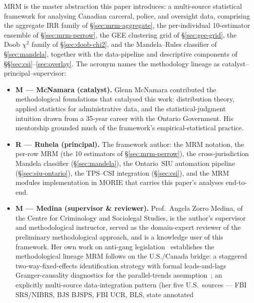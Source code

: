 \documentclass[11pt,a4paper]{article}
\theoremstyle{plain}
\theoremstyle{definition}
\theoremstyle{remark}
\begin{document}
MRM is the master abstraction this paper introduces: a multi-source
statistical framework for analysing Canadian carceral, police, and
oversight data, comprising the aggregate IRR family of
\S\ref{sec:mrm-aggregate}, the per-individual 10-estimator
ensemble of \S\ref{sec:mrm-perrow}, the GEE clustering grid of
\S\ref{sec:gee-grid}, the Doob $\chi^{2}$ family of
\S\ref{sec:doob-chi2}, and the Mandela--Rules classifier of
\S\ref{sec:mandela}, together with the data-pipeline and
descriptive components of
\S\S\ref{sec:csi}--\ref{sec:overlay}. The acronym names the
methodology lineage as catalyst--principal--supervisor:
\begin{itemize}
  \item \textbf{M --- McNamara (catalyst).} Glenn McNamara
        contributed the methodological foundations that catalysed
        this work: distribution theory, applied statistics for
        administrative data, and the statistical-judgment intuition
        drawn from a 35-year career with the Ontario Government.
        His mentorship grounded much of the framework's
        empirical-statistical practice.
  \item \textbf{R --- Ruhela (principal).} The framework author:
        the MRM notation, the per-row MRM (the 10 estimators of
        \S\ref{sec:mrm-perrow}), the cross-jurisdiction Mandela
        classifier (\S\ref{sec:mandela}), the Ontario~SIU
        automation pipeline (\S\ref{sec:siu-ontario}), the TPS--CSI
        integration (\S\ref{sec:csi}), and the MRM modules
        implementation in MORIE that carries this paper's
        analyses end-to-end.
  \item \textbf{M --- Medina (supervisor \& reviewer).} Prof.\
        Angela Zorro Medina, of the Centre for Criminology and
        Sociolegal Studies, is the author's supervisor and
        methodological instructor, served as the domain-expert
        reviewer of the preliminary methodological approach, and is
        a knowledge user of this framework. Her own work on
        anti-gang
        legislation~\cite{ZorroMedina2023JMP} establishes the
        methodological lineage MRM follows on the U.S./Canada
        bridge: a staggered two-way-fixed-effects identification
        strategy with formal leads-and-lags Granger-causality
        diagnostics for the parallel-trends
        assumption~\cite{Athey2022Staggered, CallawaySantanna2021,
        GoodmanBacon2021DiD}; an explicitly multi-source
        data-integration pattern (her five U.S.\ sources --- FBI
        SRS/NIBRS, BJS BJSPS, FBI UCR, BLS, state annotated

\end{itemize}
\end{document}
